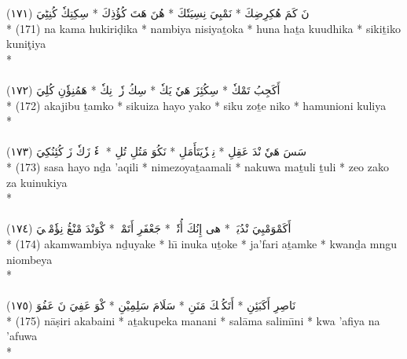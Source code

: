 \documentclass[a4paper, 12pt]{report}
\begin{document}
\begin{center}
\textarabic{(١٧١) \textcolor{mygreen}{نَ كَمَ هُكِرِضِكَ  * نَمْبِيَ نِسِيَتٗكَ  * هُنَ هَتَ كُؤُذِكَ  * سِكِتِكٗ كُنِٹِيَ }} \\* 
(171) na kama hukiriḍika  * nambiya nisiyaṯoka  * huna haṯa kuudhika  * sikiṯiko kuniţiya  \\* 
 \\ 
\\[8mm] 

\textarabic{(١٧٢) \textcolor{mygreen}{أَكَجِبُ تَمْكٗ  * سِكُئِزَ هَيٗ يَكٗ  * سِكُ زٗتٖ نِكٗ  * هَمُنِؤٗنِ كُلِيَ }} \\* 
(172) akajibu ṯamko  * sikuiza hayo yako  * siku zoṯe niko  * hamunioni kuliya  \\* 
 \\ 
\\[8mm] 

\textarabic{(١٧٣) \textcolor{mygreen}{سَسَ هَيٗ نْدَ عَقِلِ  * نِمٖزٗيَتَأَمَلِ  * نَكُوَ مَتُلِ تُلِ  * زٖءٗ زَكٗ زَ كُئِنُكِيَ }} \\* 
(173) sasa hayo nḏa 'aqili  * nimezoyaṯaamali  * nakuwa maṯuli ṯuli  * zeo zako za kuinukiya  \\* 
 \\ 
\\[8mm] 

\textarabic{(١٧٤) \textcolor{mygreen}{أَكَمْوَمْبِيَ نْدُيَكٖ  * هى إِنُكَ أُتٗكٖ  * جَعْفَرِ أَتَمْكٖ  * كْوَنْدَ مْنْڠُ نِؤٗمْبٖيَ }} \\* 
(174) akamwambiya nḏuyake  * hı̄ inuka uṯoke  * ja'fari aṯamke  * kwanḏa mngu niombeya  \\* 
 \\ 
\\[8mm] 

\textarabic{(١٧٥) \textcolor{mygreen}{نَاصِرِ أَكَبَئِنِ  * أَتَكُپٖكَ مَنَنِ  * سَلَامَ سَلِمِيْنِ  * كْوَ عَفِيَ نَ عَفُوَ }} \\* 
(175) nāṣiri akabaini  * aṯakupeka manani  * salāma salimı̄ni  * kwa 'afiya na 'afuwa  \\* 
 \\ 
\\[8mm] 


\end{center}
\end{document}

